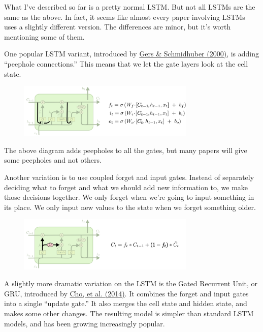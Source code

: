 What I’ve described so far is a pretty normal LSTM. But not all LSTMs are the same as the above. In fact, it seems like almost every paper involving LSTMs uses a slightly different version. The differences are minor, but it’s worth mentioning some of them.

One popular LSTM variant, introduced by \href{ftp://ftp.idsia.ch/pub/juergen/TimeCount-IJCNN2000.pdf}{Gers \& Schmidhuber (2000)}, is adding “peephole connections.” This means that we let the gate layers look at the cell state.

\begin{figure}[htbp]
	\centering
	\includegraphics[width=0.75\textwidth]{fig/12.png}
\end{figure}

The above diagram adds peepholes to all the gates, but many papers will give some peepholes and not others.

Another variation is to use coupled forget and input gates. Instead of separately deciding what to forget and what we should add new information to, we make those decisions together. We only forget when we’re going to input something in its place. We only input new values to the state when we forget something older.

\begin{figure}[htbp]
	\centering
	\includegraphics[width=0.75\textwidth]{fig/13.png}
\end{figure}

A slightly more dramatic variation on the LSTM is the Gated Recurrent Unit, or GRU, introduced by \href{http://arxiv.org/pdf/1406.1078v3.pdf}{Cho, et al. (2014)}. It combines the forget and input gates into a single “update gate.” It also merges the cell state and hidden state, and makes some other changes. The resulting model is simpler than standard LSTM models, and has been growing increasingly popular.

